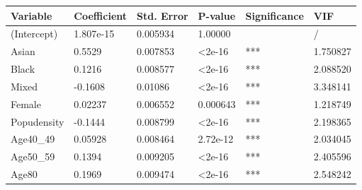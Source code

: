 \clearpage
\begin{table}[]
\centering
\begin{tabular}{|llllll|}
\hline
\multicolumn{1}{|l|}{\textbf{Variable}} & \multicolumn{1}{l|}{\textbf{Coefficient}} & \multicolumn{1}{l|}{\textbf{Std. Error}} & \multicolumn{1}{l|}{\textbf{P-value}} & \multicolumn{1}{l|}{\textbf{Significance}} & \textbf{VIF} \\ \hline
\multicolumn{1}{|l|}{(Intercept)}       & \multicolumn{1}{l|}{1.807e-15}            & \multicolumn{1}{l|}{0.005934} & \multicolumn{1}{l|}{1.00000}          & \multicolumn{1}{l|}{}                      & /            \\ \hline
\multicolumn{1}{|l|}{Asian}             & \multicolumn{1}{l|}{0.5529}               & \multicolumn{1}{l|}{0.007853} & \multicolumn{1}{l|}{\textless 2e-16}  & \multicolumn{1}{l|}{***}                   & 1.750827     \\ \hline
\multicolumn{1}{|l|}{Black}             & \multicolumn{1}{l|}{0.1216}               & \multicolumn{1}{l|}{0.008577} & \multicolumn{1}{l|}{\textless 2e-16}  & \multicolumn{1}{l|}{***}                   & 2.088520     \\ \hline
\multicolumn{1}{|l|}{Mixed}             & \multicolumn{1}{l|}{-0.1608}              & \multicolumn{1}{l|}{0.01086} & \multicolumn{1}{l|}{\textless 2e-16}  & \multicolumn{1}{l|}{***}                   & 3.348141     \\ \hline
\multicolumn{1}{|l|}{Female}            & \multicolumn{1}{l|}{0.02237}              & \multicolumn{1}{l|}{0.006552} & \multicolumn{1}{l|}{0.000643}         & \multicolumn{1}{l|}{***}                   & 1.218749     \\ \hline
\multicolumn{1}{|l|}{Popudensity}       & \multicolumn{1}{l|}{-0.1444}              & \multicolumn{1}{l|}{0.008799} & \multicolumn{1}{l|}{\textless 2e-16}  & \multicolumn{1}{l|}{***}                   & 2.198365     \\ \hline
\multicolumn{1}{|l|}{Age40\_49}         & \multicolumn{1}{l|}{0.05928}              & \multicolumn{1}{l|}{0.008464} & \multicolumn{1}{l|}{2.72e-12}         & \multicolumn{1}{l|}{***}                   & 2.034045     \\ \hline
\multicolumn{1}{|l|}{Age50\_59}         & \multicolumn{1}{l|}{0.1394}               & \multicolumn{1}{l|}{0.009205} & \multicolumn{1}{l|}{\textless 2e-16}  & \multicolumn{1}{l|}{***}                   & 2.405596     \\ \hline
\multicolumn{1}{|l|}{Age80}             & \multicolumn{1}{l|}{0.1969}               & \multicolumn{1}{l|}{0.009474} & \multicolumn{1}{l|}{\textless 2e-16}  & \multicolumn{1}{l|}{***}                   & 2.548242     \\ \hline

\end{tabular}
\end{table}
